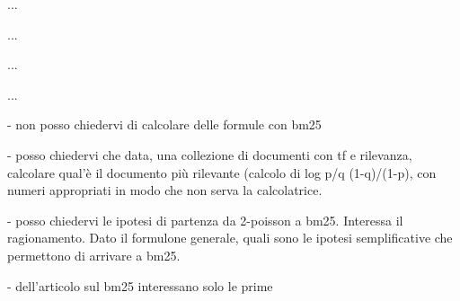 ...

...

...

...

- non posso chiedervi di  calcolare delle formule con bm25

- posso chiedervi che data, una collezione di documenti con tf e rilevanza, calcolare qual'è il documento più rilevante (calcolo di log p/q (1-q)/(1-p), con numeri appropriati in modo che non serva la calcolatrice.

- posso chiedervi le ipotesi di partenza da 2-poisson a bm25. Interessa il ragionamento. Dato il formulone generale, quali sono le ipotesi semplificative che permettono di arrivare a bm25.

- dell'articolo sul bm25 interessano solo le prime








